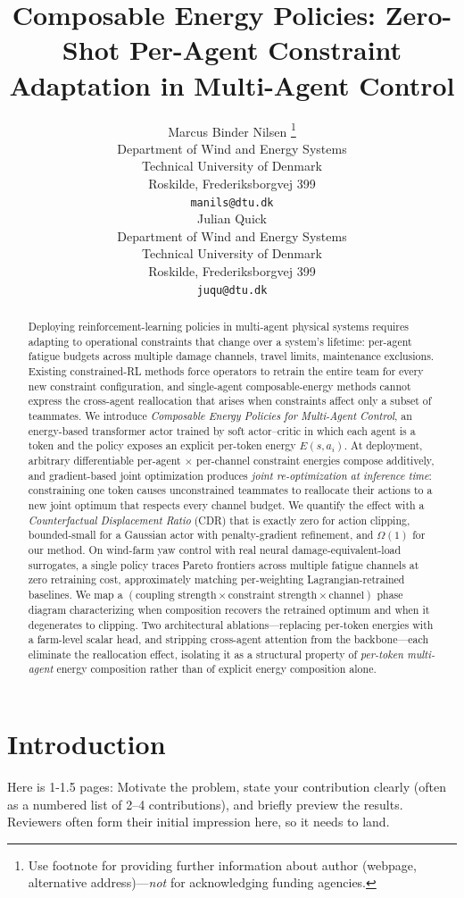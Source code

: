 \documentclass{article}
\title{Composable Energy Policies: Zero-Shot Per-Agent Constraint Adaptation in Multi-Agent Control}
\author{%
  Marcus Binder Nilsen \thanks{Use footnote for providing further information
    about author (webpage, alternative address)---\emph{not} for acknowledging
    funding agencies.} \\
  Department of Wind and Energy Systems\\
  Technical University of Denmark \\
  Roskilde, Frederiksborgvej 399 \\
  \texttt{manils@dtu.dk} \\
  \And
  Julian Quick  \\
  Department of Wind and Energy Systems\\
  Technical University of Denmark \\
  Roskilde, Frederiksborgvej 399 \\
  \texttt{juqu@dtu.dk} \\
}
\begin{document}
\maketitle


\begin{abstract}
Deploying reinforcement-learning policies in multi-agent physical systems requires adapting to operational constraints that change over a system's lifetime: per-agent fatigue budgets across multiple damage channels, travel limits, maintenance exclusions. Existing constrained-RL methods force operators to retrain the entire team for every new constraint configuration, and single-agent composable-energy methods cannot express the cross-agent reallocation that arises when constraints affect only a subset of teammates. We introduce \emph{Composable Energy Policies for Multi-Agent Control}, an energy-based transformer actor trained by soft actor--critic in which each agent is a token and the policy exposes an explicit per-token energy $E(s, a_i)$. At deployment, arbitrary differentiable per-agent $\times$ per-channel constraint energies compose additively, and gradient-based joint optimization produces \emph{joint re-optimization at inference time}: constraining one token causes unconstrained teammates to reallocate their actions to a new joint optimum that respects every channel budget. We quantify the effect with a \emph{Counterfactual Displacement Ratio} (CDR) that is exactly zero for action clipping, bounded-small for a Gaussian actor with penalty-gradient refinement, and $\Omega(1)$ for our method. On wind-farm yaw control with real neural damage-equivalent-load surrogates, a single policy traces Pareto frontiers across multiple fatigue channels at zero retraining cost, approximately matching per-weighting Lagrangian-retrained baselines. We map a $(\text{coupling strength} \times \text{constraint strength} \times \text{channel})$ phase diagram characterizing when composition recovers the retrained optimum and when it degenerates to clipping. Two architectural ablations---replacing per-token energies with a farm-level scalar head, and stripping cross-agent attention from the backbone---each eliminate the reallocation effect, isolating it as a structural property of \emph{per-token multi-agent} energy composition rather than of explicit energy composition alone.
\end{abstract}


\section{Introduction}
\label{sec:introduction}
Here is 1-1.5 pages: Motivate the problem, state your contribution clearly (often as a numbered list of 2–4 contributions), and briefly preview the results. Reviewers often form their initial impression here, so it needs to land.
\end{document}
